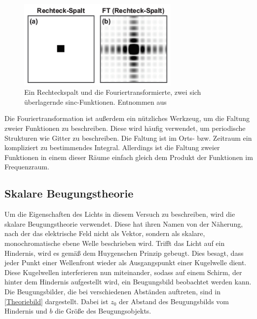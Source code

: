 \begin{figure}[h!]
	\centering
	\includegraphics[width=0.7\textwidth]{rechteckspalt.png}
	\caption{Ein Rechteckspalt und die Fouriertransformierte, zwei sich überlagernde sinc-Funktionen. Entnommen aus \cite[4]{anleitung-ws2014}}
	\label{rechteckspalt}
\end{figure}

Die Fouriertransformation ist außerdem ein nützliches Werkzeug, um die Faltung zweier Funktionen zu beschreiben. Diese wird häufig verwendet, um periodische Strukturen wie Gitter zu beschreiben. Die Faltung ist im Orts- bzw. Zeitraum ein kompliziert zu bestimmendes Integral. Allerdings ist die Faltung zweier Funktionen in einem dieser Räume einfach gleich dem Produkt der Funktionen im Frequenzraum.

\subsection{Skalare Beugungstheorie}
Um die Eigenschaften des Lichts in diesem Versuch zu beschreiben, wird die skalare Beugungstheorie verwendet. Diese hat ihren Namen von der Näherung, nach der das elektrische Feld nicht als Vektor, sondern als skalare, monochromatische ebene Welle beschrieben wird. Trifft das Licht auf ein Hindernis, wird es gemäß dem Huygenschen Prinzip gebeugt. Dies besagt, dass jeder Punkt einer Wellenfront wieder als Ausgangspunkt einer Kugelwelle dient. Diese Kugelwellen interferieren nun miteinander, sodass auf einem Schirm, der hinter dem Hindernis aufgestellt wird, ein Beugungsbild beobachtet werden kann. Die Beugungsbilder, die bei verschiedenen Abständen auftreten, sind in \cref{Theoriebild} dargestellt. Dabei ist $z_0$ der Abstand des Beugungsbilds vom Hindernis und $b$ die Größe des Beugungsobjekts.

